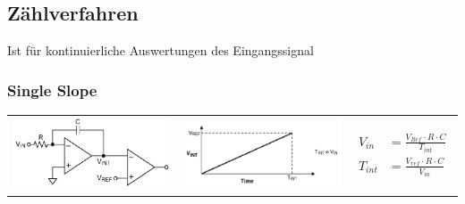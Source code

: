 \subsection{Zählverfahren } 
Ist für kontinuierliche Auswertungen des Eingangssignal
\subsubsection{Single Slope}

\begin{tabular}{ccp{4cm}}
  \includegraphics[width=5cm, valign=t]{pictures/singleSlope1} &
  \includegraphics[width=5cm, valign=t]{pictures/singleSlope2} &
  {\begin{align*}
    V_{in}&=\frac{V_{Ref} \cdot R \cdot C}{T_{int}}\\
    T_{int} &= \frac{V_{ref} \cdot R\cdot C}{V_{in}}
  \end{align*}} \\
\end{tabular}

